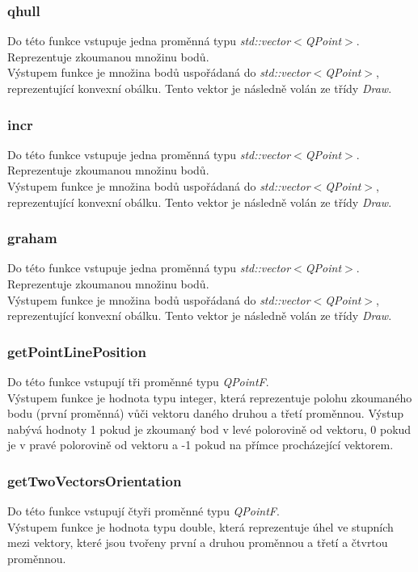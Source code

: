 \documentclass{article}
\begin{document}
\subsubsection{qhull}
Do této funkce vstupuje jedna proměnná typu  \emph{std::vector$<$QPoint$>$}. Reprezentuje zkoumanou množinu bodů.\\
Výstupem funkce je množina bodů uspořádaná do \emph{std::vector$<$QPoint$>$}, reprezentující konvexní obálku. Tento vektor je následně volán ze třídy \emph{Draw}.

\subsubsection{incr}
Do této funkce vstupuje jedna proměnná typu  \emph{std::vector$<$QPoint$>$}. Reprezentuje zkoumanou množinu bodů.\\
Výstupem funkce je množina bodů uspořádaná do \emph{std::vector$<$QPoint$>$}, reprezentující konvexní obálku. Tento vektor je následně volán ze třídy \emph{Draw}.

\subsubsection{graham}
Do této funkce vstupuje jedna proměnná typu  \emph{std::vector$<$QPoint$>$}. Reprezentuje zkoumanou množinu bodů.\\
Výstupem funkce je množina bodů uspořádaná do \emph{std::vector$<$QPoint$>$}, reprezentující konvexní obálku. Tento vektor je následně volán ze třídy \emph{Draw}.

\subsubsection{getPointLinePosition}
Do této funkce vstupují tři proměnné typu \emph{QPointF}.\\
Výstupem funkce je hodnota typu integer, která reprezentuje polohu zkoumaného bodu (první proměnná) vůči vektoru daného druhou a třetí proměnnou. Výstup nabývá hodnoty 1 pokud je zkoumaný bod v levé polorovině od vektoru, 0 pokud je v pravé polorovině od vektoru a -1 pokud na přímce procházející vektorem.

\subsubsection{getTwoVectorsOrientation}
Do této funkce vstupují čtyři proměnné typu \emph{QPointF}.\\
Výstupem funkce je hodnota typu double, která reprezentuje úhel ve stupních mezi vektory, které jsou tvořeny první a druhou proměnnou a třetí a čtvrtou proměnnou.
\end{document}
